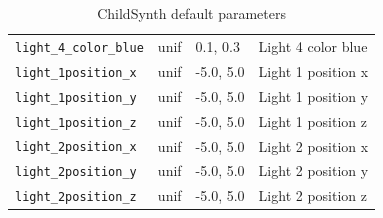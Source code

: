 \documentclass{article}
\begin{document}
\begin{table}[h]
{\begin{tabular}{|l|l|l|l|}
    \texttt{light\_4\_color\_blue} & unif & 0.1, 0.3 & Light 4 color blue\\
    \texttt{light\_1position\_x} & unif & -5.0, 5.0 & Light 1 position x\\
    \texttt{light\_1position\_y} & unif & -5.0, 5.0 & Light 1 position y\\
    \texttt{light\_1position\_z} & unif & -5.0, 5.0 & Light 1 position z\\
    \texttt{light\_2position\_x} & unif & -5.0, 5.0 & Light 2 position x\\
    \texttt{light\_2position\_y} & unif & -5.0, 5.0 & Light 2 position y\\
    \texttt{light\_2position\_z} & unif & -5.0, 5.0 & Light 2 position z\\

    \hline
    \end{tabular}
    }
    \caption{ChildSynth default parameters}
    \label{table:defaults}
\end{table}





\end{document}
